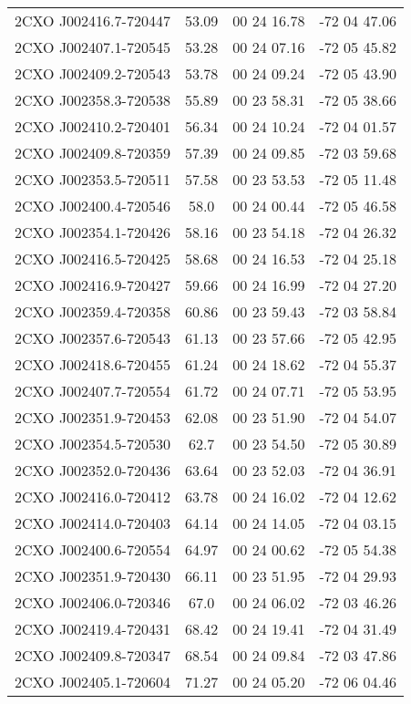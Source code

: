 \begin{table}
\begin{tabular}{cccc}
2CXO J002416.7-720447 & 53.09 & 00 24 16.78 & -72 04 47.06 \\
2CXO J002407.1-720545 & 53.28 & 00 24 07.16 & -72 05 45.82 \\
2CXO J002409.2-720543 & 53.78 & 00 24 09.24 & -72 05 43.90 \\
2CXO J002358.3-720538 & 55.89 & 00 23 58.31 & -72 05 38.66 \\
2CXO J002410.2-720401 & 56.34 & 00 24 10.24 & -72 04 01.57 \\
2CXO J002409.8-720359 & 57.39 & 00 24 09.85 & -72 03 59.68 \\
2CXO J002353.5-720511 & 57.58 & 00 23 53.53 & -72 05 11.48 \\
2CXO J002400.4-720546 & 58.0 & 00 24 00.44 & -72 05 46.58 \\
2CXO J002354.1-720426 & 58.16 & 00 23 54.18 & -72 04 26.32 \\
2CXO J002416.5-720425 & 58.68 & 00 24 16.53 & -72 04 25.18 \\
2CXO J002416.9-720427 & 59.66 & 00 24 16.99 & -72 04 27.20 \\
2CXO J002359.4-720358 & 60.86 & 00 23 59.43 & -72 03 58.84 \\
2CXO J002357.6-720543 & 61.13 & 00 23 57.66 & -72 05 42.95 \\
2CXO J002418.6-720455 & 61.24 & 00 24 18.62 & -72 04 55.37 \\
2CXO J002407.7-720554 & 61.72 & 00 24 07.71 & -72 05 53.95 \\
2CXO J002351.9-720453 & 62.08 & 00 23 51.90 & -72 04 54.07 \\
2CXO J002354.5-720530 & 62.7 & 00 23 54.50 & -72 05 30.89 \\
2CXO J002352.0-720436 & 63.64 & 00 23 52.03 & -72 04 36.91 \\
2CXO J002416.0-720412 & 63.78 & 00 24 16.02 & -72 04 12.62 \\
2CXO J002414.0-720403 & 64.14 & 00 24 14.05 & -72 04 03.15 \\
2CXO J002400.6-720554 & 64.97 & 00 24 00.62 & -72 05 54.38 \\
2CXO J002351.9-720430 & 66.11 & 00 23 51.95 & -72 04 29.93 \\
2CXO J002406.0-720346 & 67.0 & 00 24 06.02 & -72 03 46.26 \\
2CXO J002419.4-720431 & 68.42 & 00 24 19.41 & -72 04 31.49 \\
2CXO J002409.8-720347 & 68.54 & 00 24 09.84 & -72 03 47.86 \\
2CXO J002405.1-720604 & 71.27 & 00 24 05.20 & -72 06 04.46 \\

\end{tabular}
\end{table}
